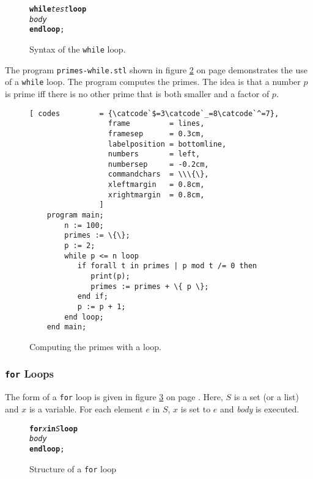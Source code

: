 \begin{figure}[!ht]
  \centering
\begin{alltt}
      \textbf{while} \textsl{test} \textbf{loop}
          \textsl{body}
      \textbf{end loop};
\end{alltt}
\vspace*{-0.3cm}
\caption{Syntax of the \texttt{while} loop.}  \label{fig:while}
\end{figure} 

The program \texttt{primes-while.stl} shown in figure \ref{fig:primes-while.stl} on page
\pageref{fig:primes-while.stl} demonstrates the use of a \texttt{while} loop.
The program computes the primes.  The idea is that a number $p$ is prime iff there is no other
prime that is both smaller and a factor of $p$.

\begin{figure}[!ht]
  \centering
\begin{Verbatim}[ codes         = {\catcode`$=3\catcode`_=8\catcode`^=7},
                  frame         = lines, 
                  framesep      = 0.3cm, 
                  labelposition = bottomline,
                  numbers       = left,
                  numbersep     = -0.2cm,
                  commandchars  = \\\{\},
                  xleftmargin   = 0.8cm,
                  xrightmargin  = 0.8cm,
                ]
    program main;
        n := 100;
        primes := \{\};
        p := 2;
        while p <= n loop
           if forall t in primes | p mod t /= 0 then
              print(p);
              primes := primes + \{ p \};
           end if;
           p := p + 1;
        end loop;
    end main;
\end{Verbatim} 
\vspace*{-0.3cm}
\caption{Computing the primes with a loop.}  \label{fig:primes-while.stl}
\end{figure} %

\subsubsection{\texttt{for} Loops}
The form of a  \texttt{for} loop is given in figure \ref{fig:for} on page
\pageref{fig:for}.  Here,  $S$ is a set (or a list) and $x$ is a variable.
For each element $e$ in $S$, $x$ is set to $e$ and  \textsl{body} is executed.


\begin{figure}[!ht]
  \centering
\begin{alltt}
      \textbf{for} \textsl{x} \textbf{in} \textsl{S} \textbf{loop}
          \textsl{body}
      \textbf{end loop};
\end{alltt}
\vspace*{-0.3cm}
\caption{Structure of a  \texttt{for} loop}  \label{fig:for}
\end{figure} 

